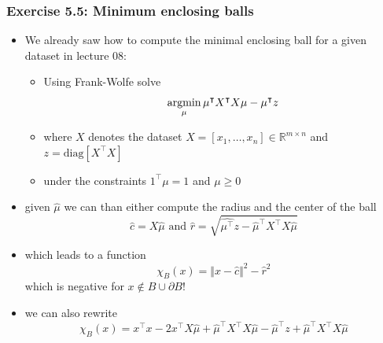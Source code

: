\documentclass[10pt,aspectratio=169,handout]{beamer}
\begin{document}
\begin{frame}
    \frametitle{Exercise 5.5: Minimum enclosing balls}

    \begin{itemize}
        \item We already saw how to compute the minimal enclosing ball for a given dataset in lecture 08:
        \begin{itemize}
            \item Using Frank-Wolfe solve \[\operatorname*{argmin}_{\mu} \mu^\intercal X^\intercal X\mu-\mu^\intercal z\]
            \item where $X$ denotes the dataset $X=[x_1,\dots,x_n]\in\mathbb{R}^{m\times n}$ and $z=\text{diag}[X^\intercal X]$
            \item under the constraints $1^\intercal\mu=1$ and $\mu\geq 0$
        \end{itemize}
        \item given $\hat{\mu}$ we can than either compute the radius and the center of the ball 
        \[\hat{c}=X\hat{\mu}\text{  and  } \hat{r}=\sqrt{\hat{\mu^\intercal}z-\hat{\mu}^\intercal X^\intercal X\hat{\mu}}\]
        \item which leads to a function \[\chi_B(x)=\Vert x-\hat{c}\Vert^2 -\hat{r}^2\] which is negative for $x\notin B\cup\partial B$!
        \item we can also rewrite \[\chi_B(x)=x^\intercal x-2x^\intercal X \hat{\mu}+\hat{\mu}^\intercal X^\intercal X \hat{\mu}-\hat{\mu}^\intercal z+\hat{\mu}^\intercal X^\intercal X\hat{\mu}\]
    \end{itemize}

\end{frame}
\end{document}
